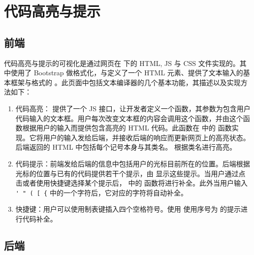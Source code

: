 \section{代码高亮与提示}

\subsection{前端}

代码高亮与提示的可视化是通过网页在  下的 HTML, JS 与 CSS 文件实现的。其中使用了 Bootstrap 做格式化，与定义了一个 HTML 元素、提供了文本输入的基本框架与格式的 \href{https://github.com/WebCoder49/code-input}{} 。此页面中包括文本编译器的几个基本功能，其描述以及实现方法如下：

\begin{enumerate}
    \item 代码高亮： 提供了一个 JS 接口，让开发者定义一个函数，其参数为包含用户代码输入的文本框。用户每次改变文本框的内容会调用这个函数，并由这个函数根据用户的输入而提供包含高亮的 HTML 代码。此函数在  中的  函数实现。它将用户的输入发给后端，并接收后端的响应而更新网页上的高亮状态。后端返回的 HTML 中包括每个记号本身与其类名。 根据类名进行高亮。
    \item 代码提示：前端发给后端的信息中包括用户的光标目前所在的位置。后端根据光标的位置与已有的代码提供若干个提示，由  显示这些提示。当用户通过点击或者使用快捷键选择某个提示后， 中的  函数将进行补全。此外当用户输入 \lstinline`' " ( [ {` 中的一个字符后，它对应的字符将自动补全。
    \item 快捷键：用户可以使用制表键插入四个空格符号。使用  使用序号为  的提示进行代码补全。
\end{enumerate}


\subsection{后端}